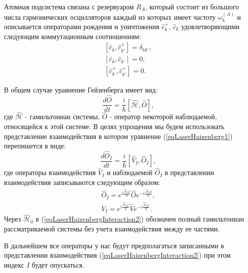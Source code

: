 Атомная подсистема связана с резервуаром $R_A$, который состоит из
большого числа гармонических осцилляторов каждый из которых имеет
частоту $\omega_k^{(A)}$ и описывается операторами рождения и
уничтожения $\hat{c}_k^{+}$, $\hat{c}_k$ удовлетворяющими следующим
коммутационным соотношениям:
\begin{eqnarray}
\left[\hat{c}_k, \hat{c}^{+}_{k'}\right] = \delta_{kk'},
\nonumber \\
\left[\hat{c}_k, \hat{c}_{k'}\right] = 0,
\nonumber \\
\left[\hat{c}^{+}_k, \hat{c}^{+}_{k'}\right] = 0.
\nonumber
\end{eqnarray}

В общем случае уравнение Гейзенберга имеет вид:
\begin{equation}
\frac{d \hat{O}}{d t} = \frac{i}{\hbar}\left[\hat{\mathcal{H}},
  \hat{O}\right], 
\label{eqLaserHaizenberg1}
\end{equation}
где $\hat{\mathcal{H}}$ - гамильтониан системы, $\hat{O}$ - оператор
некоторой наблюдаемой, относящейся к этой системе. В целях упрощения
мы будем использовать представление взаимодействия в котором уравнение
(\ref{eqLaserHaizenberg1}) перепишется в виде:
\begin{equation}
\frac{d \hat{O}_I}{d t} = \frac{i}{\hbar}\left[\hat{V}_I,
  \hat{O}_I\right], 
\label{eqLaserHaizenbergInteraction1}
\end{equation}
где операторы взаимодействия $\hat{V}_I$ и наблюдаемой $\hat{O}_I$ в
представлении взаимодействия записываются следующим образом: 
\begin{eqnarray}
\hat{O}_I = 
e^{i\frac{\hat{\mathcal{H}}_0t}{\hbar}}
\hat{O}
e^{-i\frac{\hat{\mathcal{H}}_0t}{\hbar}},
\nonumber \\
\hat{V}_I = 
e^{i\frac{\hat{\mathcal{H}}_0t}{\hbar}}
\hat{V}
e^{-i\frac{\hat{\mathcal{H}}_0t}{\hbar}}.
\label{eqLaserHaizenbergInteraction2}
\end{eqnarray}
Через $\hat{\mathcal{H}}_0$ в (\ref{eqLaserHaizenbergInteraction2})
обозначен полный гамильтониан рассматриваемой системы без учета
взаимодействия между ее частями. 

В дальнейшем все операторы у нас будут предполагаться записанными в
представлении взаимодействия (\ref{eqLaserHaizenbergInteraction2}) при
этом индекс $I$ будет опускаться.

